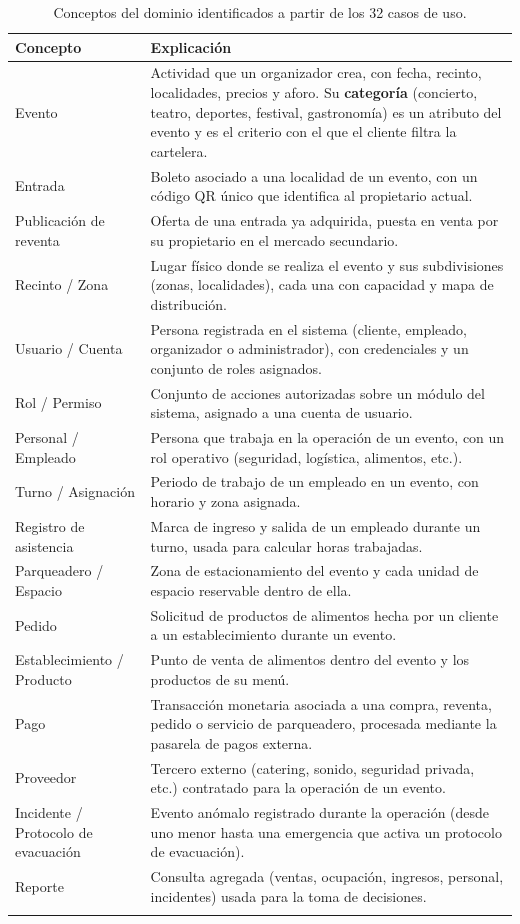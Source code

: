 \documentclass[11pt,a4paper]{article}
\begin{document}
\begin{center}
\begin{longtable}{p{3.8cm}p{9.7cm}}
\toprule
\textbf{Concepto} & \textbf{Explicación}\\
\midrule
\endhead
Evento & Actividad que un organizador crea, con fecha, recinto, localidades, precios y aforo.
Su \textbf{categoría} (concierto, teatro, deportes, festival, gastronomía) es un atributo del
evento y es el criterio con el que el cliente filtra la cartelera.\\[0.3em]
Entrada & Boleto asociado a una localidad de un evento, con un código QR único que identifica al
propietario actual.\\[0.3em]
Publicación de reventa & Oferta de una entrada ya adquirida, puesta en venta por su propietario en
el mercado secundario.\\[0.3em]
Recinto / Zona & Lugar físico donde se realiza el evento y sus subdivisiones (zonas, localidades),
cada una con capacidad y mapa de distribución.\\[0.3em]
Usuario / Cuenta & Persona registrada en el sistema (cliente, empleado, organizador o
administrador), con credenciales y un conjunto de roles asignados.\\[0.3em]
Rol / Permiso & Conjunto de acciones autorizadas sobre un módulo del sistema, asignado a una
cuenta de usuario.\\[0.3em]
Personal / Empleado & Persona que trabaja en la operación de un evento, con un rol operativo
(seguridad, logística, alimentos, etc.).\\[0.3em]
Turno / Asignación & Periodo de trabajo de un empleado en un evento, con horario y zona
asignada.\\[0.3em]
Registro de asistencia & Marca de ingreso y salida de un empleado durante un turno, usada para
calcular horas trabajadas.\\[0.3em]
Parqueadero / Espacio & Zona de estacionamiento del evento y cada unidad de espacio reservable
dentro de ella.\\[0.3em]
Pedido & Solicitud de productos de alimentos hecha por un cliente a un establecimiento durante un
evento.\\[0.3em]
Establecimiento / Producto & Punto de venta de alimentos dentro del evento y los productos de su
menú.\\[0.3em]
Pago & Transacción monetaria asociada a una compra, reventa, pedido o servicio de parqueadero,
procesada mediante la pasarela de pagos externa.\\[0.3em]
Proveedor & Tercero externo (catering, sonido, seguridad privada, etc.) contratado para la
operación de un evento.\\[0.3em]
Incidente / Protocolo de evacuación & Evento anómalo registrado durante la operación (desde uno
menor hasta una emergencia que activa un protocolo de evacuación).\\[0.3em]
Reporte & Consulta agregada (ventas, ocupación, ingresos, personal, incidentes) usada para la
toma de decisiones.\\
\bottomrule
\caption{Conceptos del dominio identificados a partir de los 32 casos de uso.}
\label{tab:dominio}
\end{longtable}
\end{center}
\end{document}
